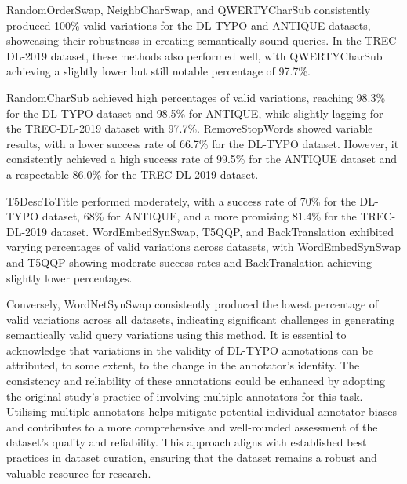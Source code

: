 RandomOrderSwap, NeighbCharSwap, and QWERTYCharSub consistently produced 100\% valid variations for the DL-TYPO and ANTIQUE datasets, showcasing their robustness in creating semantically sound queries. In the TREC-DL-2019 dataset, these methods also performed well, with QWERTYCharSub achieving a slightly lower but still notable percentage of 97.7\%.

RandomCharSub achieved high percentages of valid variations, reaching 98.3\% for the DL-TYPO dataset and 98.5\% for ANTIQUE, while slightly lagging for the TREC-DL-2019 dataset with 97.7\%. RemoveStopWords showed variable results, with a lower success rate of 66.7\% for the DL-TYPO dataset. However, it consistently achieved a high success rate of 99.5\% for the ANTIQUE dataset and a respectable 86.0\% for the TREC-DL-2019 dataset.

T5DescToTitle performed moderately, with a success rate of 70\% for the DL-TYPO dataset, 68\% for ANTIQUE, and a more promising 81.4\% for the TREC-DL-2019 dataset. WordEmbedSynSwap, T5QQP, and BackTranslation exhibited varying percentages of valid variations across datasets, with WordEmbedSynSwap and T5QQP showing moderate success rates and BackTranslation achieving slightly lower percentages.

Conversely, WordNetSynSwap consistently produced the lowest percentage of valid variations across all datasets, indicating significant challenges in generating semantically valid query variations using this method. It is essential to acknowledge that variations in the validity of DL-TYPO annotations can be attributed, to some extent, to the change in the annotator's identity. The consistency and reliability of these annotations could be enhanced by adopting the original study's practice of involving multiple annotators for this task. Utilising multiple annotators helps mitigate potential individual annotator biases and contributes to a more comprehensive and well-rounded assessment of the dataset's quality and reliability. This approach aligns with established best practices in dataset curation, ensuring that the dataset remains a robust and valuable resource for research.